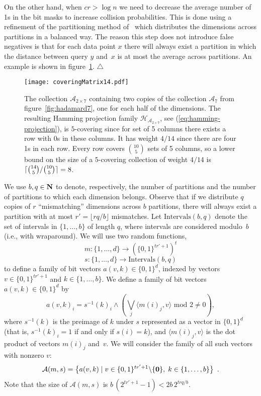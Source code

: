 \documentclass[prodmode,acmtalg]{acmsmall}
\begin{document}
On the other hand, when $cr > \log n$ we need to decrease the average number of 1s in the bit masks to increase collision probabilities. This is done using a refinement of the partitioning method of~\cite{Arasu_VLDB06} which distributes the dimensions across partitions in a balanced way.
The reason this step does not introduce false negatives is that for each data point $x$ there will always exist a partition in which the distance between query $y$ and~$x$ is at most the average across partitions. 
An example is shown in figure~\ref{fig:hadamard2x7}.
$\triangle$
\medskip

\begin{figure}[t]
	\begin{center}
\texttt{[image: coveringMatrix14.pdf]}
\caption{The collection $\mathcal{A}_{2\times7}$ containing two copies of the collection $\mathcal{A}_7$ from figure~\ref{fig:hadamard7}, one for each half of the dimensions. The resulting Hamming projection family  $\mathcal{H}_{\mathcal{A}_{2\times7}}$, see (\ref{eq:hamming-projection}), is $5$-covering since for set of 5 columns there exists a row with 0s in these columns. It has weight $4/14$ since there are four 1s in each row.
Every row covers $\binom{10}{5}$ sets of 5 columns, so a lower bound on the size of a $5$-covering collection of weight $4/14$ is $\lceil \tbinom{14}{5}/\tbinom{10}{5}\rceil = 8$.}\label{fig:hadamard2x7}
	\end{center}
\end{figure}


We use $b,q\in {\bf N}$ to denote, respectively, the number of partitions and the number of partitions to which each dimension belongs.
Observe that if we distribute $q$ copies of $r$ ``mismatching'' dimensions across $b$ partitions, there will always exist a partition with at most $r' = \lfloor r q/b \rfloor$ mismatches.
Let $\text{Intervals}(b,q)$ denote the set of intervals in $\{1,\dots,b\}$ of length $q$, where intervals are considered modulo~$b$ (i.e., with wraparound).
We will use two random functions,
$$m: \{1,\dots,d\} \rightarrow \left(\{0,1\}^{t r' + 1} \right)^t$$
$$s: \{1,\dots,d\} \rightarrow \text{Intervals}(b,q)$$
to define a family of bit vectors $a(v,k) \in \{0,1\}^d$, indexed by vectors $v\in \{0,1\}^{tr'+1}$ and $k\in \{1,\dots,b\}$. 
We define a family of bit vectors $a(v,k)\in \{0,1\}^d$ by
\begin{equation}\label{def:A_vk}
a(v,k)_i = s^{-1}(k)_i \wedge \left(\bigvee_j \langle m(i)_j, v\rangle \text{ mod } 2 \ne 0\right),
\end{equation}
where $s^{-1}(k)$ is the preimage of $k$ under $s$ represented as a vector in $\{0,1\}^d$ (that is, $s^{-1}(k)_i = 1$ if and only if $s(i)=k$), and $\langle m(i)_j, v\rangle$ is the dot product of vectors $ m(i)_j$ and~$v$.
We will consider the family of all such vectors with nonzero $v$:
$$\mathcal{A}(m,s) = \big\{ a(v,k) \; | \; v\in \{0,1\}^{t r'+1}\backslash\{{\bf 0}\},\; k\in\{1,\dots,b\} \big\} \enspace .$$
Note that the size of $\mathcal{A}(m,s)$ is $b\, (2^{t r'+1}-1) < 2b\, 2^{trq/b}$.
\end{document}
